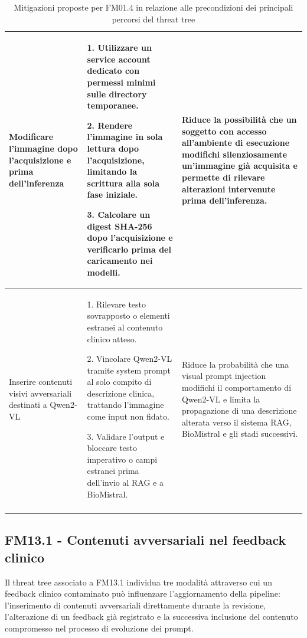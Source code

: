 {\begin{xltabular}{\textwidth}{
    >{\raggedright\arraybackslash}p{3.1cm}
    X
    X
}
\midrule


Modificare l'immagine dopo l'acquisizione e prima dell'inferenza &

1. Utilizzare un service account dedicato con permessi minimi sulle directory
temporanee.

2. Rendere l'immagine in sola lettura dopo l'acquisizione, limitando la
scrittura alla sola fase iniziale.

3. Calcolare un digest SHA-256 dopo l'acquisizione e verificarlo prima del
caricamento nei modelli. &

Riduce la possibilità che un soggetto con accesso all'ambiente di esecuzione
modifichi silenziosamente un'immagine già acquisita e permette di rilevare
alterazioni intervenute prima dell'inferenza. \\

\midrule


Inserire contenuti visivi avversariali destinati a Qwen2-VL &

1. Rilevare testo sovrapposto o elementi estranei al contenuto clinico atteso.

2. Vincolare Qwen2-VL tramite system prompt al solo compito di descrizione
clinica, trattando l'immagine come input non fidato.

3. Validare l'output e bloccare testo imperativo o campi estranei prima
dell'invio al RAG e a BioMistral. &

Riduce la probabilità che una visual prompt injection modifichi il
comportamento di Qwen2-VL e limita la propagazione di una descrizione alterata
verso il sistema RAG, BioMistral e gli stadi successivi. \\

\bottomrule

\caption{Mitigazioni proposte per FM01.4 in relazione alle precondizioni dei principali percorsi del threat tree}

\label{tab:mitigazioni-fm01-4}\\

\end{xltabular}
}

\subsection{FM13.1 - Contenuti avversariali nel feedback clinico}
Il threat tree associato a FM13.1 individua tre modalità attraverso cui un feedback clinico contaminato può influenzare l'aggiornamento della pipeline: l'inserimento di contenuti avversariali direttamente durante la revisione, l'alterazione di un feedback già registrato e la successiva inclusione del contenuto compromesso nel processo di evoluzione dei prompt.

